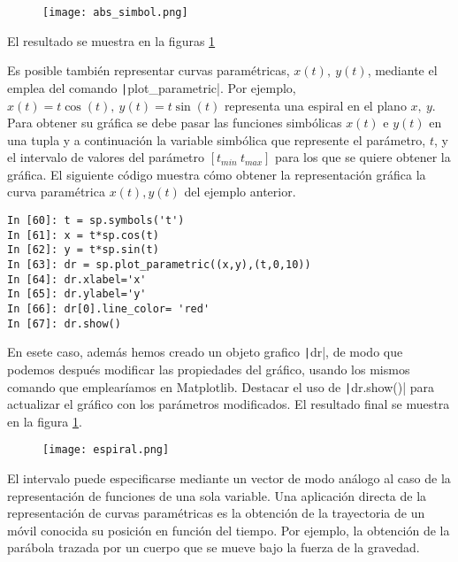 \begin{figure}
	\centering
		\texttt{[image: abs\_simbol.png]}
		 \label{fig:simplot1}
\end{figure}
El resultado se muestra en la figuras \ref{fig:simplot1}

Es posible también representar curvas paramétricas, $x(t),\ y(t)$, mediante el emplea del comando \texttt|plot_parametric|. Por ejemplo, $x(t) = t\cos(t),\  y(t)= t\sin(t)$ representa una espiral en el plano $x,\ y$. Para obtener su gráfica se debe pasar  las funciones simbólicas $x(t)$ e $y(t)$ en una tupla y a continuación la variable simbólica que represente el parámetro, $t$, y el intervalo de valores del parámetro $[t_{min} \ t_{max}]$ para los que se quiere obtener la gráfica.  El siguiente código muestra cómo obtener la representación gráfica la curva paramétrica $x(t),y(t)$ del ejemplo anterior.
\begin{center}
	\begin{minipage}{.6\textwidth}
		\begin{verbatim}
In [60]: t = sp.symbols('t')
In [61]: x = t*sp.cos(t)
In [62]: y = t*sp.sin(t)
In [63]: dr = sp.plot_parametric((x,y),(t,0,10))
In [64]: dr.xlabel='x'
In [65]: dr.ylabel='y'
In [66]: dr[0].line_color= 'red'
In [67]: dr.show()
		\end{verbatim}
	\end{minipage}
\end{center}
En esete caso, además hemos creado un objeto grafico \texttt|dr|, de modo que podemos después modificar las propiedades del gráfico, usando los mismos comando que emplearíamos en Matplotlib. Destacar el uso de \texttt|dr.show()| para actualizar el gráfico con los parámetros modificados. El resultado final se muestra en la figura \ref{fig:simplot1}.
 
\begin{figure}
	\centering
	\texttt{[image: espiral.png]}
		\label{fig:simpar}
		
\end{figure}
 
 
 El intervalo puede especificarse mediante un vector  de modo análogo al caso de la representación de funciones de una sola variable. Una aplicación directa de la representación de curvas paramétricas es la obtención de la trayectoria de un móvil conocida su posición en función del tiempo. Por ejemplo, la obtención de la parábola trazada por un cuerpo que se mueve bajo la fuerza de la gravedad. 


